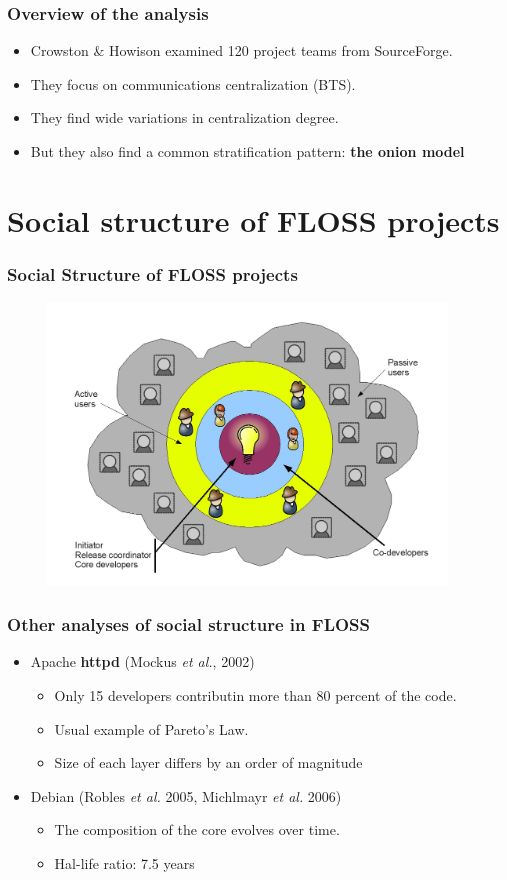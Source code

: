 \documentclass{beamer}
\begin{document}
\begin{frame}
 \frametitle{Overview of the analysis}
 \begin{itemize}
 \item Crowston \& Howison examined 120 project teams from
SourceForge.
 \item They focus on communications centralization (BTS).
 \item They find wide variations in centralization degree.
 \item But they also find a common stratification pattern:
  \textbf{the onion model}
 \end{itemize}
\end{frame}

\section{Social structure of FLOSS projects}

\begin{frame}
\frametitle{Social Structure of FLOSS projects}
\begin{center}
\begin{figure}
 \includegraphics[height=7.5cm]{figs/onion-model.jpg}
\end{figure}
\end{center}
\end{frame}

\begin{frame}
 \frametitle{Other analyses of social structure in FLOSS}
 \begin{itemize}
  \item Apache \textbf{httpd} (Mockus \emph{et al.}, 2002)
  \begin{itemize}
   \item Only 15 developers contributin more than 80 percent
   of the code.
   \item Usual example of Pareto's Law.
   \item Size of each layer differs by an order of magnitude
  \end{itemize}
  \item Debian (Robles \emph{et al.} 2005, Michlmayr \emph{et al.} 2006)
  \begin{itemize}
   \item The composition of the core evolves over time.
   \item Hal-life ratio: 7.5 years
  \end{itemize}
 \end{itemize}
\end{frame}
\end{document}
